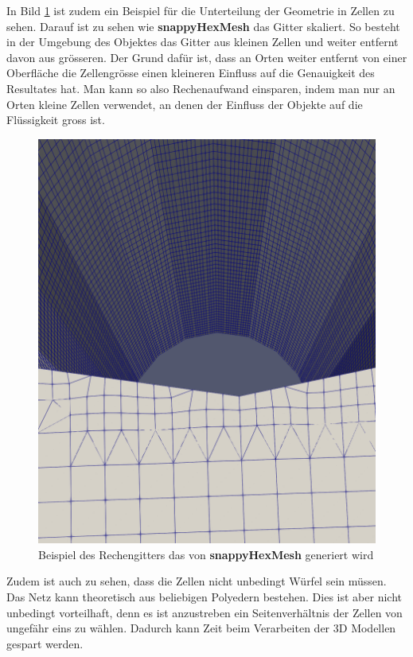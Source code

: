 In Bild \ref{openfoam:fig:sim_grid} ist zudem ein Beispiel für die Unterteilung der Geometrie in Zellen zu sehen.
Darauf ist zu sehen wie \textbf{snappyHexMesh} das Gitter skaliert.
So besteht in der Umgebung des Objektes das Gitter aus kleinen Zellen und weiter entfernt davon aus grösseren.
Der Grund dafür ist, dass an Orten weiter entfernt von einer Oberfläche die Zellengrösse einen kleineren Einfluss auf die Genauigkeit des Resultates hat.
Man kann so also Rechenaufwand einsparen, indem man nur an Orten kleine Zellen verwendet, an denen der Einfluss der Objekte auf die Flüssigkeit gross ist.
\begin{figure}
	\centering
	\includegraphics[scale=0.1]{papers/openfoam/Bilder/grid.png }
	\caption{Beispiel des Rechengitters das von \textbf{snappyHexMesh} generiert wird}
	\label{openfoam:fig:sim_grid}
\end{figure}
Zudem ist auch zu sehen, dass die Zellen nicht unbedingt Würfel sein müssen.
Das Netz kann theoretisch aus beliebigen Polyedern bestehen.
Dies ist aber nicht unbedingt vorteilhaft, denn es ist anzustreben ein Seitenverhältnis der Zellen von ungefähr eins zu wählen. 
Dadurch kann Zeit beim Verarbeiten der 3D Modellen gespart werden.

